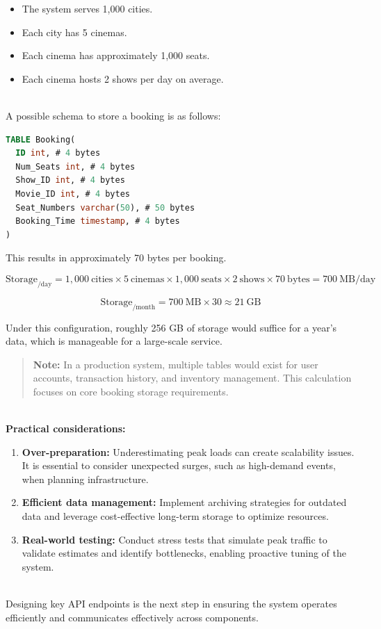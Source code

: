 \begin{itemize}
\item
\protect{}\label{umz_00atOnrf7Nyy5nmrc}
The system serves 1,000 cities.
\item
\protect{}\label{T4U8DN7z5nnkzAYKdRoal}
Each city has 5 cinemas.
\item
\protect{}\label{mP3xZiP50zG6cUQ2b9jqP}
Each cinema has approximately 1,000 seats.
\item
\protect{}\label{2Ex0Xs6Rfpyamubrm2Hbh}
Each cinema hosts 2 shows per day on average.
\end{itemize}
\\
A possible schema to store a booking is as follows:

\begin{lstlisting}[language=SQL]
TABLE Booking(
  ID int, # 4 bytes
  Num_Seats int, # 4 bytes
  Show_ID int, # 4 bytes
  Movie_ID int, # 4 bytes
  Seat_Numbers varchar(50), # 50 bytes 
  Booking_Time timestamp, # 4 bytes
)
\end{lstlisting}

This results in approximately 70 bytes per booking.

\[
\text{Storage}_{\text{/day}} = 1,000 \ \text{cities} \times 5 \ \text{cinemas} \times 1,000 \ \text{seats} \times 2 \ \text{shows} \times 70 \ \text{bytes} = 700 \ \text{MB/day}
\]

\[
\text{Storage}_{\text{/month}} = 700 \ \text{MB} \times 30 \approx 21\ \text{GB}
\]

Under this configuration, roughly 256 GB of storage would suffice for a year's data, which is manageable for a large-scale service.
\begin{quote}
\textbf{Note:} In a production system, multiple tables would exist for user accounts, transaction history, and inventory management. This calculation focuses on core booking storage requirements.
\end{quote}
\\
\textbf{Practical considerations:}

\begin{enumerate}
\item
\textbf{Over-preparation:} Underestimating peak loads can create scalability issues. It is essential to consider unexpected surges, such as high-demand events, when planning infrastructure.
\item
\textbf{Efficient data management:} Implement archiving strategies for outdated data and leverage cost-effective long-term storage to optimize resources.
\item
\textbf{Real-world testing:} Conduct stress tests that simulate peak traffic to validate estimates and identify bottlenecks, enabling proactive tuning of the system.
\end{enumerate}
\\
Designing key API endpoints is the next step in ensuring the system operates efficiently and communicates effectively across components.

